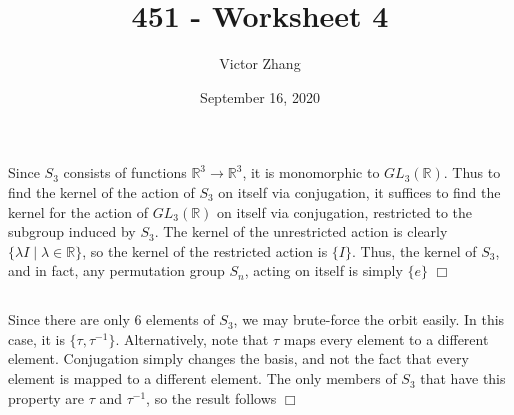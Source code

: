 \documentclass{article}
\title{451 - Worksheet 4}
\author{Victor Zhang}
\date{September 16, 2020}
\begin{document}
\maketitle

\section{}
\subsection{}
Since $S_3$ consists of functions $\mathbb{R}^3 \rightarrow \mathbb{R}^3$, it is monomorphic to $GL_3(\mathbb{R})$. Thus to find the kernel of the action of $S_3$ on itself via conjugation, it suffices to find the kernel for the action of $GL_3(\mathbb{R})$ on itself via conjugation, restricted to the subgroup induced by $S_3$. The kernel of the unrestricted action is clearly $\{\lambda I \; | \; \lambda \in \mathbb{R}\}$, so the kernel of the restricted action is $\{I\}$. Thus, the kernel of $S_3$, and in fact, any permutation group $S_n$, acting on itself is simply $\{e\}$ $\Box$

\subsection{}
Since there are only 6 elements of $S_3$, we may brute-force the orbit easily. In this case, it is $\{\tau, \tau^{-1}\}$. Alternatively, note that $\tau$ maps every element to a different element. Conjugation simply changes the basis, and not the fact that every element is mapped to a different element. The only members of $S_3$ that have this property are $\tau$ and $\tau^{-1}$, so the result follows $\Box$
\end{document}
